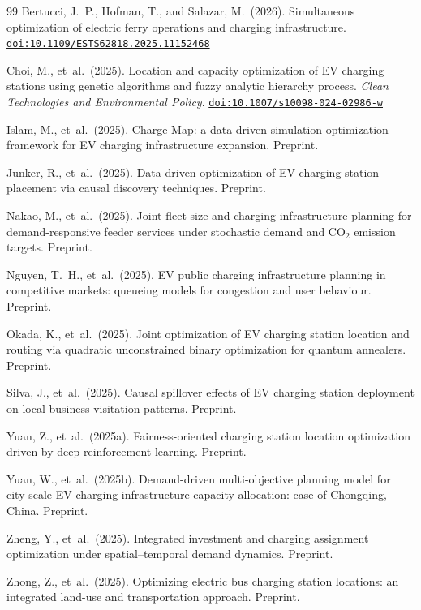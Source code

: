 \documentclass[12pt,letterpaper]{article}
\newcommand{\doi}[1]{\href{https://doi.org/#1}{\texttt{doi:#1}}}
\begin{document}
\begin{thebibliography}{99}
Bertucci, J.\ P., Hofman, T., and Salazar, M.\ (2026).
Simultaneous optimization of electric ferry operations and charging
  infrastructure.
\doi{10.1109/ESTS62818.2025.11152468}

Choi, M., et~al.\ (2025).
Location and capacity optimization of EV charging stations using
  genetic algorithms and fuzzy analytic hierarchy process.
\textit{Clean Technologies and Environmental Policy}.
\doi{10.1007/s10098-024-02986-w}

Islam, M., et~al.\ (2025).
Charge-Map: a data-driven simulation-optimization framework for EV
  charging infrastructure expansion.
Preprint.

Junker, R., et~al.\ (2025).
Data-driven optimization of EV charging station placement via causal
  discovery techniques.
Preprint.

Nakao, M., et~al.\ (2025).
Joint fleet size and charging infrastructure planning for demand-responsive
  feeder services under stochastic demand and CO$_2$ emission targets.
Preprint.

Nguyen, T.\ H., et~al.\ (2025).
EV public charging infrastructure planning in competitive markets:
  queueing models for congestion and user behaviour.
Preprint.

Okada, K., et~al.\ (2025).
Joint optimization of EV charging station location and routing via
  quadratic unconstrained binary optimization for quantum annealers.
Preprint.

Silva, J., et~al.\ (2025).
Causal spillover effects of EV charging station deployment on local
  business visitation patterns.
Preprint.

Yuan, Z., et~al.\ (2025a).
Fairness-oriented charging station location optimization driven by deep
  reinforcement learning.
Preprint.

Yuan, W., et~al.\ (2025b).
Demand-driven multi-objective planning model for city-scale EV charging
  infrastructure capacity allocation: case of Chongqing, China.
Preprint.

Zheng, Y., et~al.\ (2025).
Integrated investment and charging assignment optimization under
  spatial--temporal demand dynamics.
Preprint.

Zhong, Z., et~al.\ (2025).
Optimizing electric bus charging station locations: an integrated
  land-use and transportation approach.
Preprint.



\end{thebibliography}
\end{document}
